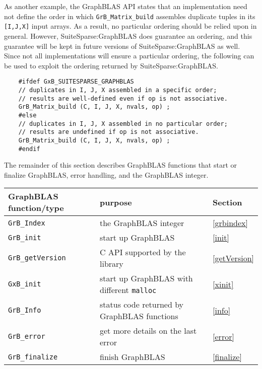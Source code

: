 \documentclass[12pt]{article}
\begin{document}
{As another example, the GraphBLAS API states that an
implementation need not define the order in which \verb'GrB_Matrix_build'
assembles duplicate tuples in its \verb'[I,J,X]' input arrays.  As a result, no
particular ordering should be relied upon in general.  However,
SuiteSparse:GraphBLAS does guarantee an ordering, and this guarantee will be
kept in future versions of SuiteSparse:GraphBLAS as well.  Since not all
implementations will ensure a particular ordering, the following can be used to
exploit the ordering returned by SuiteSparse:GraphBLAS.

    {\footnotesize
    \begin{verbatim}
    #ifdef GxB_SUITESPARSE_GRAPHBLAS
    // duplicates in I, J, X assembled in a specific order;
    // results are well-defined even if op is not associative.
    GrB_Matrix_build (C, I, J, X, nvals, op) ;
    #else
    // duplicates in I, J, X assembled in no particular order;
    // results are undefined if op is not associative.
    GrB_Matrix_build (C, I, J, X, nvals, op) ;
    #endif \end{verbatim}}

The remainder of this section describes GraphBLAS functions that start or finalize GraphBLAS,
error handling, and the GraphBLAS integer.

\vspace{0.2in}
{\footnotesize
\begin{tabular}{lll}
\hline
GraphBLAS function/type   & purpose                                 & Section \\
\hline
\verb'GrB_Index'     & the GraphBLAS integer                        & \ref{grbindex} \\
\verb'GrB_init'      & start up GraphBLAS                           & \ref{init} \\
\verb'GrB_getVersion'& C API supported by the library               & \ref{getVersion} \\
\verb'GxB_init'      & start up GraphBLAS with different \verb'malloc' & \ref{xinit} \\
\verb'GrB_Info'      & status code returned by GraphBLAS functions  & \ref{info} \\
\verb'GrB_error'     & get more details on the last error           & \ref{error} \\
\verb'GrB_finalize'  & finish GraphBLAS                             & \ref{finalize} \\
\hline
\end{tabular}
}
\vspace{0.2in}

}
\end{document}
